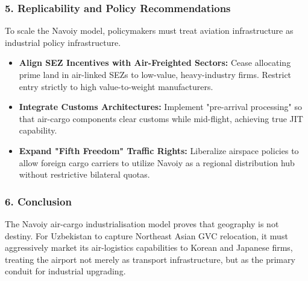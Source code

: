 \documentclass[11pt,a4paper]{article}
\begin{document}
\subsubsection*{5. Replicability and Policy Recommendations}
To scale the Navoiy model, policymakers must treat aviation infrastructure as industrial policy infrastructure. 
\begin{itemize}
    \item \textbf{Align SEZ Incentives with Air-Freighted Sectors:} Cease allocating prime land in air-linked SEZs to low-value, heavy-industry firms. Restrict entry strictly to high value-to-weight manufacturers.
    \item \textbf{Integrate Customs Architectures:} Implement "pre-arrival processing" so that air-cargo components clear customs while mid-flight, achieving true JIT capability.
    \item \textbf{Expand "Fifth Freedom" Traffic Rights:} Liberalize airspace policies to allow foreign cargo carriers to utilize Navoiy as a regional distribution hub without restrictive bilateral quotas.
\end{itemize}

\subsubsection*{6. Conclusion}
The Navoiy air-cargo industrialisation model proves that geography is not destiny. For Uzbekistan to capture Northeast Asian GVC relocation, it must aggressively market its air-logistics capabilities to Korean and Japanese firms, treating the airport not merely as transport infrastructure, but as the primary conduit for industrial upgrading.
\end{document}
